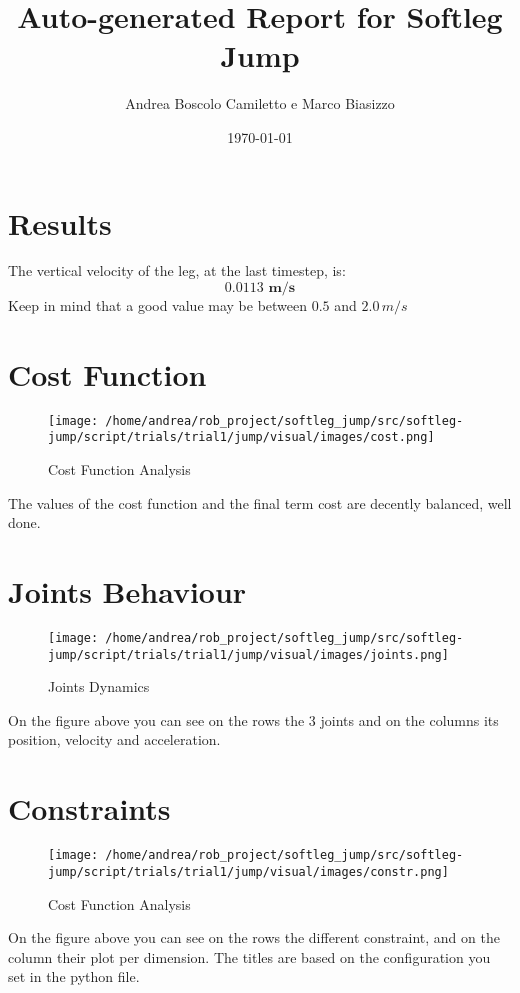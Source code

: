 \documentclass{article}%
\title{Auto{-}generated Report for Softleg Jump}%
\author{Andrea Boscolo Camiletto e Marco Biasizzo}%
\date{\today}%
\begin{document}
%
\normalsize%
\maketitle%
\section{Results}%
\label{sec:Results}%
The vertical velocity of the leg, at the last timestep, is:%
\[%
\boldsymbol{0.0113\,\, m/s}%
\]%
Keep in mind that a good value may be between $0.5$ and $2.0 \, m/s$

%
\section{Cost Function}%
\label{sec:CostFunction}%


\begin{figure}[h!]%
\centering%
\texttt{[image: /home/andrea/rob\_project/softleg\_jump/src/softleg-jump/script/trials/trial1/jump/visual/images/cost.png]}%
\caption{Cost Function Analysis}%
\end{figure}

%
%
The values of the cost function and the final term cost are decently balanced, well done.

%
\pagebreak%
\section{Joints Behaviour}%
\label{sec:JointsBehaviour}%


\begin{figure}[h!]%
\centering%
\texttt{[image: /home/andrea/rob\_project/softleg\_jump/src/softleg-jump/script/trials/trial1/jump/visual/images/joints.png]}%
\caption{Joints Dynamics}%
\end{figure}

%
On the figure above you can see on the rows the 3 joints and on the columns its position, velocity and acceleration.

%
\pagebreak%
\section{Constraints}%
\label{sec:Constraints}%


\begin{figure}[h!]%
\centering%
\texttt{[image: /home/andrea/rob\_project/softleg\_jump/src/softleg-jump/script/trials/trial1/jump/visual/images/constr.png]}%
\caption{Cost Function Analysis}%
\end{figure}

%
On the figure above you can see on the rows the different constraint, and on the column their plot per dimension. The titles are based on the configuration you set in the python file.

%
\end{document}
